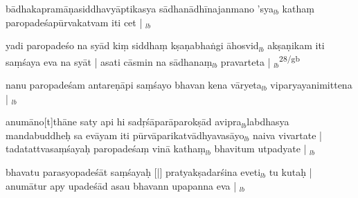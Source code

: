 \documentclass[article,12pt,a4paper]{memoir}%
\newcounter{parCount}
\begin{document}
	  
	  \pstart \leavevmode%
	bādhakapramāṇasiddhavyāptikasya sādhanādhīnajanmano 'sya{\tiny $_{lb}$} kathaṃ paropadeśapūrvakatvam iti cet |
	{}
	\pend%
      {\tiny $_{lb}$}

	  
	  \pstart \leavevmode%
	yadi paropadeśo na syād kiṃ siddhaṃ kṣaṇabhaṅgi āhosvid{\tiny $_{lb}$} akṣaṇikam iti saṃśaya eva na syāt | asati cāsmin na sādhanaṃ{\tiny $_{lb}$} pravarteta |
	{}
	\pend%
      {\tiny $_{lb}$}\textsuperscript{\textenglish{28/gb}}

	  
	  \pstart \leavevmode%
	nanu paropadeśam antareṇāpi saṃśayo bhavan kena vāryeta{\tiny $_{lb}$} viparyayanimittena |
	{}
	\pend%
      {\tiny $_{lb}$}

	  
	  \pstart \leavevmode%
	anumāno[t]thāne saty api hi sadṛśāparāparokṣād avipra{\tiny $_{lb}$}labdhasya mandabuddheḥ sa evāyam iti pūrvāparikatvādhyavasāyo{\tiny $_{lb}$} naiva vivartate | tadatattvasaṃśayaḥ paropadeśaṃ vinā kathaṃ{\tiny $_{lb}$} bhavi\leavevmode{}tum utpadyate |
	{}
	\pend%
      {\tiny $_{lb}$}

	  
	  \pstart \leavevmode%
	bhavatu parasyopadeśāt saṃśayaḥ [|] pratyakṣadarśina eveti{\tiny $_{lb}$} tu kutaḥ | anumātur apy upadeśād asau bhavann upapanna eva |
	{}
	\pend%
      {\tiny $_{lb}$}
\end{document}
